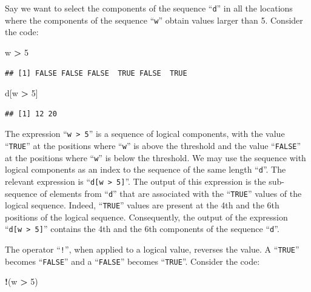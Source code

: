 \documentclass[
]{krantz}
\makeatletter
\newenvironment{Shaded}{\begin{snugshade}}{\end{snugshade}}
\newcommand{\DecValTok}[1]{\textcolor[rgb]{0.00,0.00,0.81}{#1}}
\newcommand{\NormalTok}[1]{#1}
\newcommand{\OperatorTok}[1]{\textcolor[rgb]{0.81,0.36,0.00}{\textbf{#1}}}
\newcommand{\StringTok}[1]{\textcolor[rgb]{0.31,0.60,0.02}{#1}}
\newenvironment{kframe}{%
\medskip{}
\setlength{\fboxsep}{.8em}
 \def\at@end@of@kframe{}%
 \ifinner\ifhmode%
  \def\at@end@of@kframe{\end{minipage}}%
  \begin{minipage}{\columnwidth}%
 \fi\fi%
 \def\FrameCommand##1{\hskip\@totalleftmargin \hskip-\fboxsep
 \colorbox{shadecolor}{##1}\hskip-\fboxsep
     \hskip-\linewidth \hskip-\@totalleftmargin \hskip\columnwidth}%
 \MakeFramed {\advance\hsize-\width
   \@totalleftmargin\z@ \linewidth\hsize
   \@setminipage}}%
 {\par\unskip\endMakeFramed%
 \at@end@of@kframe}
\renewenvironment{Shaded}{\begin{kframe}}{\end{kframe}}
\theoremstyle{definition}
\theoremstyle{definition}
\theoremstyle{definition}
\theoremstyle{remark}
\makeatother
\begin{document}
Say we want to select the components of the sequence ``\texttt{d}'' in all the
locations where the components of the sequence ``\texttt{w}'' obtain values
larger than 5. Consider the code:

\begin{Shaded}
\begin{Highlighting}[]
\NormalTok{w }\OperatorTok{>}\StringTok{ }\DecValTok{5}
\end{Highlighting}
\end{Shaded}

\begin{verbatim}
## [1] FALSE FALSE FALSE  TRUE FALSE  TRUE
\end{verbatim}

\begin{Shaded}
\begin{Highlighting}[]
\NormalTok{d[w }\OperatorTok{>}\StringTok{ }\DecValTok{5}\NormalTok{]}
\end{Highlighting}
\end{Shaded}

\begin{verbatim}
## [1] 12 20
\end{verbatim}

The expression ``\texttt{w\ \textgreater{}\ 5}'' is a sequence of logical components, with the
value ``\texttt{TRUE}'' at the positions where ``\texttt{w}'' is above the threshold and
the value ``\texttt{FALSE}'' at the positions where ``\texttt{w}'' is below the threshold.
We may use the sequence with logical components as an index to the
sequence of the same length ``\texttt{d}''. The relevant expression is
``\texttt{d{[}w\ \textgreater{}\ 5{]}}''. The output of this expression is the sub-sequence of
elements from ``\texttt{d}'' that are associated with the ``\texttt{TRUE}'' values of the
logical sequence. Indeed, ``\texttt{TRUE}'' values are present at the 4th and the
6th positions of the logical sequence. Consequently, the output of the
expression ``\texttt{d{[}w\ \textgreater{}\ 5{]}}'' contains the 4th and the 6th components of the
sequence ``\texttt{d}''.

The operator ``\texttt{!}'', when applied to a logical value, reverses the value.
A ``\texttt{TRUE}'' becomes ``\texttt{FALSE}'' and a ``\texttt{FALSE}'' becomes ``\texttt{TRUE}''. Consider
the code:

\begin{Shaded}
\begin{Highlighting}[]
\OperatorTok{!}\NormalTok{(w }\OperatorTok{>}\StringTok{ }\DecValTok{5}\NormalTok{)}
\end{Highlighting}
\end{Shaded}
\end{document}
